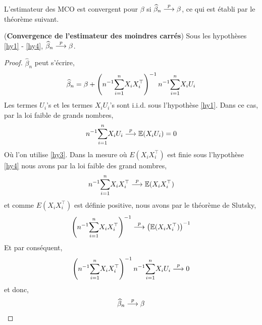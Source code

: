 \documentclass[12pt, reqno]{amsart}
\begin{document}
L'estimateur des MCO est convergent pour $\beta$ si $\widehat{\beta}_n \overset{p}{\longrightarrow} \beta$, ce qui est établi par le théorème suivant.
\begin{theoreme}(\textbf{Convergence de l'estimateur des moindres carrés})
Sous les hypothèses \ref{hy1} - \ref{hy4}, $\widehat{\beta}_n \overset{p}{\longrightarrow} \beta$.
\end{theoreme}
\begin{proof}
$\widehat{\beta}_n$ peut s'écrire,
\begin{align}
\widehat{\beta}_n = \beta +  \left(n^{-1}\underset{i=1}{\overset{n}{\sum}} X_iX_i^\top\right)^{-1}n^{-1}\underset{i=1}{\overset{n}{\sum}} X_iU_i
\label{eq1}
\end{align}
Les termes $U_i$'s et les termes $X_iU_i$'s sont i.i.d. sous l'hypothèse \ref{hy1}. Dans ce cas, par la loi faible de grands nombres,
\begin{align*}
n^{-1} \underset{i=1}{\overset{n}{\sum}} X_iU_i \overset{p}{\longrightarrow} \mathbb{E}(X_iU_i) = 0
\end{align*}
Où l'on utilise \ref{hy3}. Dans la mesure où $E(X_iX_i^\top)$ est finie sous l'hypothèse \ref{hy4} nous avons par la loi faible des grand nombres,
\begin{align*}
n^{-1} \underset{i=1}{\overset{n}{\sum}} X_iX_i^\top \overset{p}{\longrightarrow} \mathbb{E}(X_iX_i^\top)
\end{align*}
et comme  $E(X_iX_i^\top)$ est définie positive, nous avons  par le théorème de Slutsky,
\begin{align}
\left(n^{-1} \underset{i=1}{\overset{n}{\sum}} X_iX_i^\top\right)^{-1} \overset{p}{\longrightarrow} \left(\mathbb{E}(X_iX_i^\top)\right)^{-1}
\label{eq2}
\end{align}
Et par conséquent,
\begin{align*}
\left(n^{-1}\underset{i=1}{\overset{n}{\sum}} X_iX_i^\top\right)^{-1}n^{-1}\underset{i=1}{\overset{n}{\sum}} X_iU_i \overset{p}{\longrightarrow} 0
\end{align*}
et donc,
\begin{align*}
\widehat{\beta}_n \overset{p}{\longrightarrow} \beta
\end{align*}
\end{proof}
\end{document}
